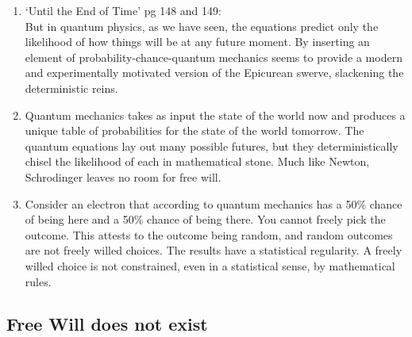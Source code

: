 \documentclass[11pt]{article}
\begin{document}
\begin{itemize}
{       \begin{enumerate}
        \item {
              ‘Until the End of Time’ pg 148 and 149: \\ But in quantum physics, as we have seen, the equations predict only the likelihood of how things will be at any future moment. By inserting an element of  probability-chance-quantum mechanics seems to provide a modern and experimentally motivated version of the Epicurean swerve, slackening the deterministic reins.
              }
        \item {
              Quantum mechanics takes as input the state of the world now and produces a unique table of probabilities for the state of the world tomorrow. The quantum equations lay out many possible futures, but they deterministically chisel the likelihood of each in mathematical stone. Much like Newton, Schrodinger leaves no room for free will.
              }
        \item {
              Consider an electron that according to quantum mechanics has a 50\% chance of being here and a 50\% chance of being there. You cannot freely pick the outcome. This attests to the outcome being random, and random outcomes are not freely willed choices. The results have a statistical regularity. A freely willed choice is not constrained, even in a statistical sense, by mathematical rules.
              }
       \end{enumerate}
       }
\end{itemize}
\subsection{Free Will does not exist}
\end{document}
